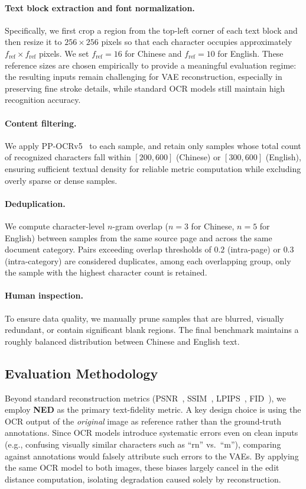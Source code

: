 \paragraph{Text block extraction and font normalization.}
Specifically, we first crop a region from the top-left corner of each text block and then resize it to $256\!\times\!256$ pixels so that each character occupies approximately 
$f_{\text{ref}}\!\times\!f_{\text{ref}}$ pixels. We set 
$f_{\text{ref}}\!=\!16$ for Chinese and  $f_{\text{ref}}\!=\!10$ for English. These reference sizes are chosen empirically to provide a meaningful evaluation regime: the resulting inputs remain challenging for VAE reconstruction, especially in preserving fine stroke details, while standard OCR models still maintain high recognition accuracy.

\paragraph{Content filtering.}
We apply PP-OCRv5~\citep{cui2025paddleocr30technicalreport} to each sample, and retain only samples whose total count of recognized characters fall within $[200, 600]$ (Chinese) or $[300, 600]$ (English), ensuring sufficient textual density for reliable metric computation while excluding overly sparse or dense samples.

\paragraph{Deduplication.}
We compute character-level $n$-gram overlap ($n\!=\!3$ for Chinese, $n\!=\!5$ for English) between samples from the same source page and across the same document category. Pairs exceeding overlap thresholds of $0.2$ (intra-page) or $0.3$ (intra-category) are considered duplicates, among each overlapping group, only the sample with the highest character count is retained.

\paragraph{Human inspection.}
To ensure data quality, we manually prune samples that are blurred, visually redundant, or contain significant blank regions. The final benchmark maintains a roughly balanced distribution between Chinese and English text.

\subsection{Evaluation Methodology}
Beyond standard reconstruction metrics (PSNR~\citep{psnr}, SSIM~\citep{ssim}, LPIPS~\citep{lpips}, FID~\citep{fid}), we employ \textbf{NED} as the primary text-fidelity metric. A key design choice is using the OCR output of the \emph{original} image as reference rather than the ground-truth annotations. Since OCR models introduce systematic errors even on clean inputs (e.g., confusing visually similar characters such as ``rn'' vs.\ ``m''), comparing against annotations would falsely attribute such errors to the VAEs. By applying the same OCR model to both images, these biases largely cancel in the edit distance computation, isolating degradation caused solely by reconstruction.

